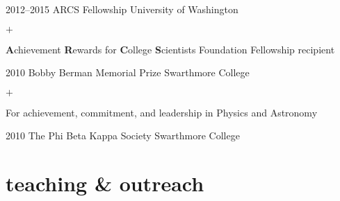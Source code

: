 \documentclass[]{luger-cv} %
\begin{document}
\begin{entrylist}


\entry
{2012--2015}
{ARCS Fellowship}
{University of Washington}
{%
\vspace{-1em}
\begin{list}{$+$}{\cvlist}
\item \textbf{A}chievement \textbf{R}ewards for \textbf{C}ollege \textbf{S}cientists
Foundation Fellowship recipient
\end{list}
}


\entry
{2010}
{Bobby Berman Memorial Prize}
{Swarthmore College}
{%
\vspace{-1em}
\begin{list}{$+$}{\cvlist}
\item For achievement, commitment, and
leadership in Physics and Astronomy
\end{list}
}


\entry
{2010}
{The Phi Beta Kappa Society}
{Swarthmore College}
{}


\end{entrylist}


\section{teaching \& outreach}
\end{document}
